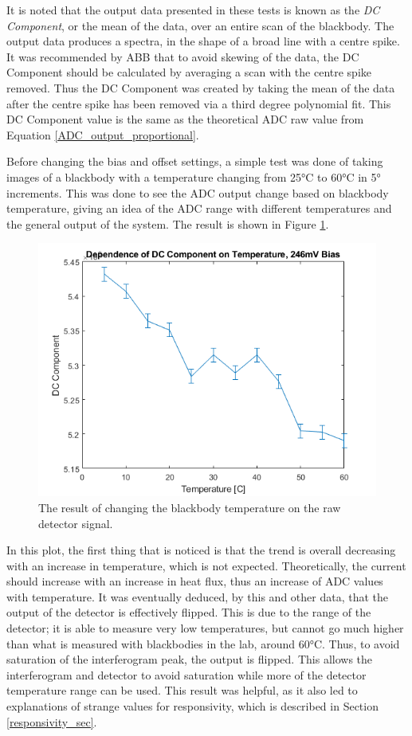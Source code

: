 It is noted that the output data presented in these tests is known as the \textit{DC Component}, or the mean of the data, over an entire scan of the blackbody. The output data produces a spectra, in the shape of a broad line with a centre spike. It was recommended by ABB that to avoid skewing of the data, the DC Component should be calculated by averaging a scan with the centre spike removed. Thus the DC Component was created by taking the mean of the data after the centre spike has been removed via a third degree polynomial fit. This DC Component value is the same as the theoretical ADC raw value from Equation \ref{ADC_output_proportional}.

Before changing the bias and offset settings, a simple test was done of taking images of a blackbody with a temperature changing from 25°C to 60°C in 5° increments. This was done to see the ADC output change based on blackbody temperature, giving an idea of the ADC range with different temperatures and the general output of the system. The result is shown in Figure \ref{fig:ADC_dep_on_bb_temp}.

\begin{figure}[h]
  \centering
  \includegraphics[width=0.8\linewidth]{chap5_images/DC_dep_on_temp.png}
  \caption{The result of changing the blackbody temperature on the raw detector signal.}
  \label{fig:ADC_dep_on_bb_temp}
\end{figure}

In this plot, the first thing that is noticed is that the trend is overall decreasing with an increase in temperature, which is not expected. Theoretically, the current should increase with an increase in heat flux, thus an increase of ADC values with temperature. It was eventually deduced, by this and other data, that the output of the detector is effectively flipped. This is due to the range of the detector; it is able to measure very low temperatures, but cannot go much higher than what is measured with blackbodies in the lab, around 60°C. Thus, to avoid saturation of the interferogram peak, the output is flipped. This allows the interferogram and detector to avoid saturation while more of the detector temperature range can be used. This result was helpful, as it also led to explanations of strange values for responsivity, which is described in Section \ref{responsivity_sec}.


